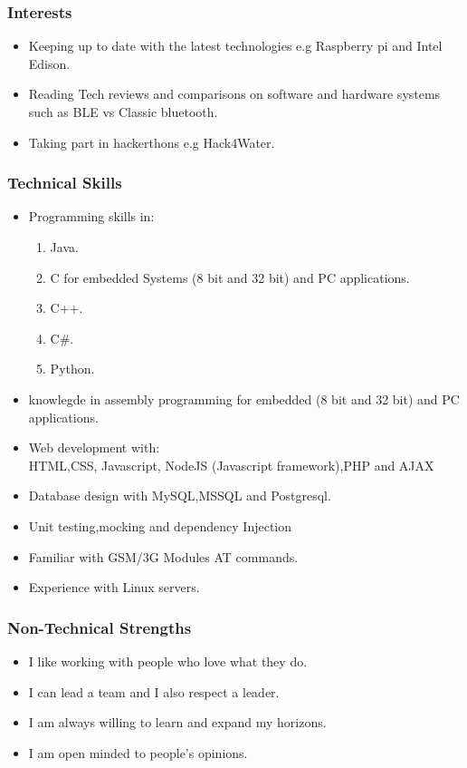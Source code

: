 \documentclass[a4paper,12pt]{article}
\begin{document}
\subsubsection{Interests}
\begin{itemize}
\item Keeping up to date with the latest technologies e.g Raspberry pi and Intel Edison.
\item Reading Tech reviews and comparisons on software and hardware systems such as BLE vs Classic bluetooth.
\item Taking part in hackerthons e.g Hack4Water.
\end{itemize}
\subsubsection{Technical Skills}
\begin{itemize}
\item Programming skills in:
\begin{enumerate}
\item Java.
\item C for embedded Systems (8 bit and 32 bit) and PC applications.
\item C++.
\item C\#.
\item Python.
\end{enumerate}
\item knowlegde in assembly programming for embedded (8 bit and 32 bit) and PC applications.
\item Web development with:\\
HTML,CSS, Javascript, NodeJS (Javascript framework),PHP and AJAX
\item Database design with MySQL,MSSQL and Postgresql.
\item Unit testing,mocking and dependency Injection
\item Familiar with GSM/3G Modules AT commands.
\item Experience with Linux servers.
\end{itemize}
\subsubsection{Non-Technical Strengths}
\begin{itemize}
\item I like working with people who love what they do.
\item I can lead a team and I also respect a leader.
\item I am always willing to learn and expand my horizons.
\item I am open minded to people's opinions.
\end{itemize}
\end{document}
